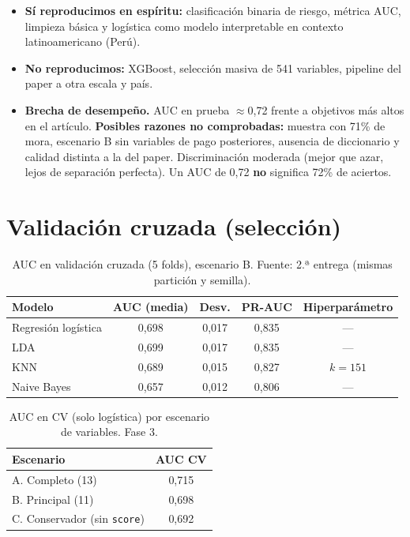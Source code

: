 \documentclass[11pt]{article}
\begin{document}
\begin{itemize}
\item \textbf{Sí reproducimos en espíritu:} clasificación binaria de riesgo, métrica AUC, limpieza básica y logística como modelo interpretable en contexto latinoamericano (Perú).
\item \textbf{No reproducimos:} XGBoost, selección masiva de 541 variables, pipeline del paper a otra escala y país.
\item \textbf{Brecha de desempeño.} AUC en prueba $\approx$0,72 frente a objetivos más altos en el artículo. \textbf{Posibles razones no comprobadas:} muestra con 71\% de mora, escenario B sin variables de pago posteriores, ausencia de diccionario y calidad distinta a la del paper. Discriminación moderada (mejor que azar, lejos de separación perfecta). Un AUC de 0,72 \textbf{no} significa 72\% de aciertos.
\end{itemize}

\section{Validación cruzada (selección)}

\begin{table}[H]
\centering
\caption{AUC en validación cruzada (5 folds), escenario B. Fuente: 2.ª entrega (mismas partición y semilla).}
\label{tab:cv}
\small
\begin{tabular}{@{}lcccc@{}}
\toprule
\textbf{Modelo} & \textbf{AUC (media)} & \textbf{Desv.} & \textbf{PR-AUC} & \textbf{Hiperparámetro} \\
\midrule
Regresión logística & 0,698 & 0,017 & 0,835 & --- \\
LDA & 0,699 & 0,017 & 0,835 & --- \\
KNN & 0,689 & 0,015 & 0,827 & $k = 151$ \\
Naive Bayes & 0,657 & 0,012 & 0,806 & --- \\
\bottomrule
\end{tabular}
\end{table}

\begin{table}[H]
\centering
\caption{AUC en CV (solo logística) por escenario de variables. Fase 3.}
\label{tab:cvabc}
\small
\begin{tabular}{@{}lc@{}}
\toprule
\textbf{Escenario} & \textbf{AUC CV} \\
\midrule
A. Completo (13) & 0,715 \\
B. Principal (11) & 0,698 \\
C. Conservador (sin \texttt{score}) & 0,692 \\
\bottomrule
\end{tabular}
\end{table}
\end{document}
